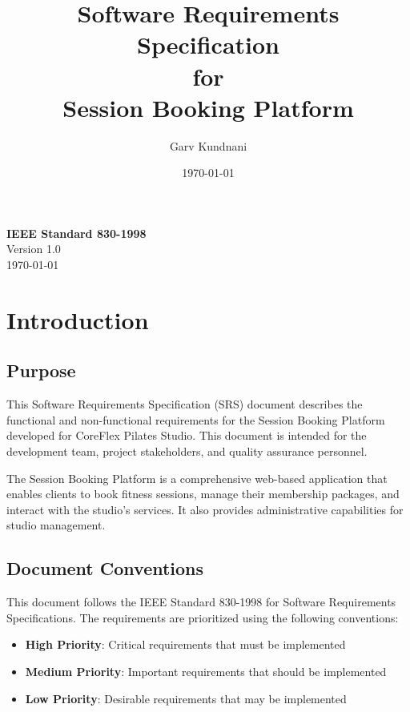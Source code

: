 \documentclass[12pt,a4paper]{article}
\title{\textbf{Software Requirements Specification\\for\\Session Booking Platform}}
\author{Garv Kundnani}
\date{\today}
\begin{document}
\maketitle

\begin{center}
\Large
\textbf{IEEE Standard 830-1998}\\
\vspace{0.5cm}
\normalsize
Version 1.0\\
\today
\end{center}

\newpage

\tableofcontents

\newpage

\section{Introduction}

\subsection{Purpose}
This Software Requirements Specification (SRS) document describes the functional and non-functional requirements for the Session Booking Platform developed for CoreFlex Pilates Studio. This document is intended for the development team, project stakeholders, and quality assurance personnel.

The Session Booking Platform is a comprehensive web-based application that enables clients to book fitness sessions, manage their membership packages, and interact with the studio's services. It also provides administrative capabilities for studio management.

\subsection{Document Conventions}
This document follows the IEEE Standard 830-1998 for Software Requirements Specifications. The requirements are prioritized using the following conventions:
\begin{itemize}
    \item \textbf{High Priority}: Critical requirements that must be implemented
    \item \textbf{Medium Priority}: Important requirements that should be implemented
    \item \textbf{Low Priority}: Desirable requirements that may be implemented
\end{itemize}
\end{document}
